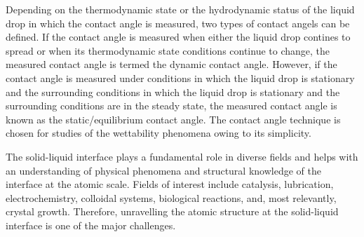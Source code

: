 Depending on the thermodynamic state or the hydrodynamic status of the liquid drop in which the contact angle is measured, two types of contact angels can be defined. If the contact angle is measured when either the liquid drop contines to spread or when its thermodynamic state conditions continue to change, the measured contact angle is termed the dynamic contact angle. However, if the contact angle is measured under conditions in which the liquid drop is stationary and the surrounding conditions in which the liquid drop is stationary and the surrounding conditions are in the steady state, the measured contact angle is known as the static/equilibrium contact angle. The contact angle technique is chosen for studies of the wettability phenomena owing to its simplicity. 

The solid-liquid interface plays a fundamental role in diverse fields and helps with an understanding of physical phenomena and structural knowledge of the interface at the atomic scale. Fields of interest include catalysis, lubrication, electrochemistry, colloidal systems, biological reactions, and, most relevantly, crystal growth. Therefore, unravelling the atomic structure at the solid-liquid interface is one of the major challenges. 

